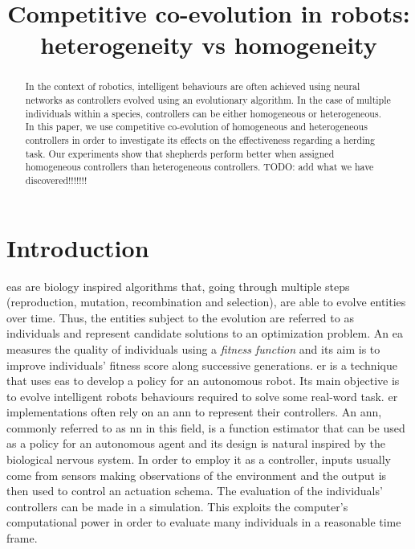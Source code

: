\documentclass[conference]{IEEEtran}
\begin{document}
 
\title{Competitive co-evolution in robots: \\ heterogeneity vs homogeneity}



\author{
}



\maketitle


\begin{abstract}
In the context of robotics, intelligent behaviours are often achieved using neural networks as controllers evolved using  an evolutionary algorithm.
In the case of multiple individuals within a species, controllers can be either homogeneous or heterogeneous.
In this paper, we use competitive co-evolution of homogeneous and heterogeneous controllers in order to investigate its effects on the effectiveness regarding a herding task.
Our experiments show that shepherds perform better when assigned homogeneous controllers than heterogeneous controllers.
TODO: add what we have discovered!!!!!!!
\end{abstract}


\IEEEpeerreviewmaketitle


\section{Introduction}
\glspl{ea} are biology inspired algorithms that, going through multiple steps (reproduction, mutation, recombination and selection), are able to evolve entities over time.
Thus, the entities subject to the evolution are referred to as individuals and represent candidate solutions to an optimization problem.
An \gls{ea} measures the quality of individuals using a \textit{fitness function} and its aim is to improve individuals' fitness score along successive generations.
\gls{er} is a technique that uses \gls{ea}s to develop a policy for an autonomous robot.
Its main objective is to evolve intelligent robots behaviours required to solve some real-word task.
\gls{er} implementations often rely on an \gls{ann} to represent their controllers.
An \gls{ann}, commonly referred to as \gls{nn} in this field, is a function estimator that can be used as a policy for an autonomous agent and its design is natural inspired by the biological nervous system.
In order to employ it as a controller, inputs usually come from sensors making observations of the environment and the output is then used to control an actuation schema.
The evaluation of the individuals' controllers can be made in a simulation.
This exploits the computer's computational power in order to evaluate many individuals in a reasonable time frame.
\end{document}
